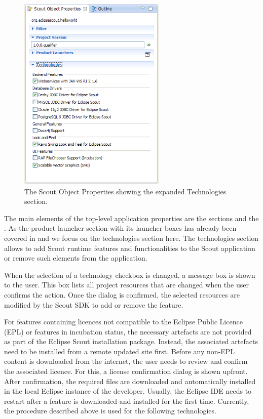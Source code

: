 \documentclass[a4paper,10pt,twoside]{book}
\begin{document}
\begin{figure}
\includegraphics[width=7cm]{properties_technologies.png}
\caption{The Scout Object Properties showing the expanded Technologies section.}
\end{figure}

The main elements of the top-level application properties are the sections  and the . 
As the product launcher section with its launcher boxes has already been covered in  and  we focus on the technologies section here.
The technologies section allows to add Scout runtime features and functionalities to the Scout application or remove such elements from the application. 

When the selection of a technology checkbox is changed, a message box is shown to the user. 
This box lists all project resources that are changed when the user confirms the action. 
Once the dialog is confirmed, the selected resources are modified by the Scout SDK to add or remove the feature. 

For features containing licences not compatible to the Eclipse Public Licence (EPL) or features in incubation status, the necessary artefacts are not provided as part of the Eclipse Scout installation package. 
Instead, the associated artefacts need to be installed from a remote updated site first. 
Before any non-EPL content is downloaded from the internet, the user needs to review and confirm the associated licence. 
For this, a license confirmation dialog is shown upfront. 
After confirmation, the required files are downloaded and automatically installed in the local Eclipse instance of the developer. 
Usually, the Eclipse IDE needs to restart after a feature is downloaded and installed for the first time. 
Currently, the procedure described above is used for the following technologies. 
\end{document}
